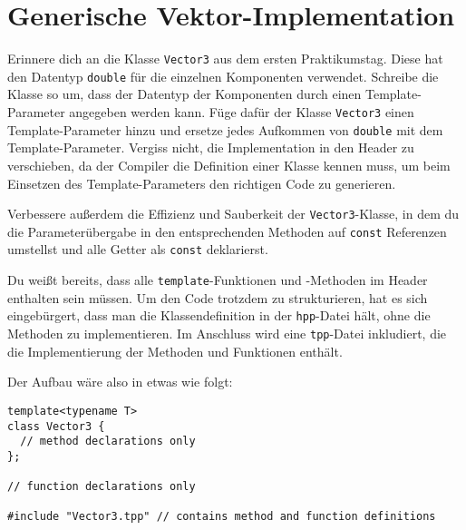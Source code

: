 \section{Generische Vektor-Implementation}
Erinnere dich an die Klasse \texttt{Vector3} aus dem ersten Praktikumstag. Diese hat den Datentyp \texttt{double} für die einzelnen Komponenten verwendet. Schreibe die Klasse so um, dass der Datentyp der Komponenten durch einen Template-Parameter angegeben werden kann.
Füge dafür der Klasse \texttt{Vector3} einen Template-Parameter hinzu und ersetze jedes Aufkommen von \texttt{double} mit dem Template-Parameter.
Vergiss nicht, die Implementation in den Header zu verschieben, da der Compiler die Definition einer Klasse kennen muss, um beim Einsetzen des Template-Parameters den richtigen Code zu generieren.

Verbessere außerdem die Effizienz und Sauberkeit der \texttt{Vector3}-Klasse, in dem du die Parameterübergabe in den entsprechenden Methoden auf \texttt{const} Referenzen umstellst und alle Getter als \texttt{const} deklarierst.

Du weißt bereits, dass alle \texttt{template}-Funktionen und -Methoden im Header enthalten sein müssen.
Um den Code trotzdem zu strukturieren, hat es sich eingebürgert, dass man die Klassendefinition in der \texttt{hpp}-Datei hält, ohne die Methoden zu implementieren.
Im Anschluss wird eine \texttt{tpp}-Datei inkludiert, die die Implementierung der Methoden und Funktionen enthält.
    
Der Aufbau wäre also in etwas wie folgt:
\begin{lstlisting}
template<typename T>
class Vector3 {
  // method declarations only
};

// function declarations only

#include "Vector3.tpp" // contains method and function definitions
\end{lstlisting}

